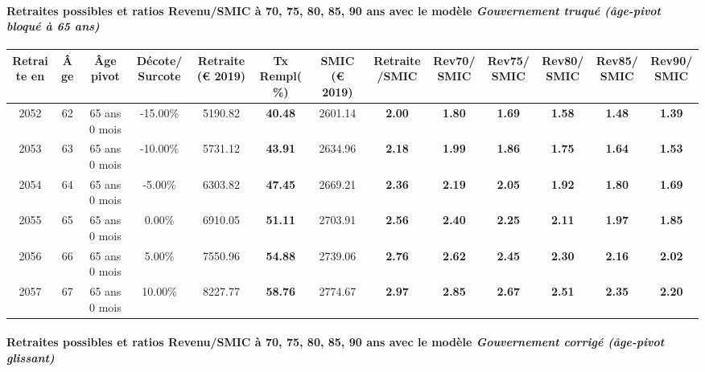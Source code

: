 \paragraph{Retraites possibles et ratios Revenu/SMIC à 70, 75, 80, 85, 90 ans avec le modèle \emph{Gouvernement truqué (âge-pivot bloqué à 65 ans)}}  
 
{ \scriptsize \begin{center} 
\begin{tabular}[htb]{|c|c||c|c||c|c||c||c|c|c|c|c|c|} 
\hline 
 Retraite en &  Âge &  Âge pivot &  Décote/Surcote &  Retraite (\euro{} 2019) &  Tx Rempl(\%) &  SMIC (\euro{} 2019) &  Retraite/SMIC &  Rev70/SMIC &  Rev75/SMIC &  Rev80/SMIC &  Rev85/SMIC &  Rev90/SMIC \\ 
\hline \hline 
 2052 &  62 &  65 ans 0 mois &  -15.00\% &  5190.82 &  {\bf 40.48} &  2601.14 &  {\bf 2.00} &  {\bf 1.80} &  {\bf 1.69} &  {\bf 1.58} &  {\bf 1.48} &  {\bf 1.39} \\ 
\hline 
 2053 &  63 &  65 ans 0 mois &  -10.00\% &  5731.12 &  {\bf 43.91} &  2634.96 &  {\bf 2.18} &  {\bf 1.99} &  {\bf 1.86} &  {\bf 1.75} &  {\bf 1.64} &  {\bf 1.53} \\ 
\hline 
 2054 &  64 &  65 ans 0 mois &  -5.00\% &  6303.82 &  {\bf 47.45} &  2669.21 &  {\bf 2.36} &  {\bf 2.19} &  {\bf 2.05} &  {\bf 1.92} &  {\bf 1.80} &  {\bf 1.69} \\ 
\hline 
 2055 &  65 &  65 ans 0 mois &  0.00\% &  6910.05 &  {\bf 51.11} &  2703.91 &  {\bf 2.56} &  {\bf 2.40} &  {\bf 2.25} &  {\bf 2.11} &  {\bf 1.97} &  {\bf 1.85} \\ 
\hline 
 2056 &  66 &  65 ans 0 mois &  5.00\% &  7550.96 &  {\bf 54.88} &  2739.06 &  {\bf 2.76} &  {\bf 2.62} &  {\bf 2.45} &  {\bf 2.30} &  {\bf 2.16} &  {\bf 2.02} \\ 
\hline 
 2057 &  67 &  65 ans 0 mois &  10.00\% &  8227.77 &  {\bf 58.76} &  2774.67 &  {\bf 2.97} &  {\bf 2.85} &  {\bf 2.67} &  {\bf 2.51} &  {\bf 2.35} &  {\bf 2.20} \\ 
\hline 
\hline 
\end{tabular} 
\end{center} } 
\paragraph{Retraites possibles et ratios Revenu/SMIC à 70, 75, 80, 85, 90 ans avec le modèle \emph{Gouvernement corrigé (âge-pivot glissant)}}  
 
